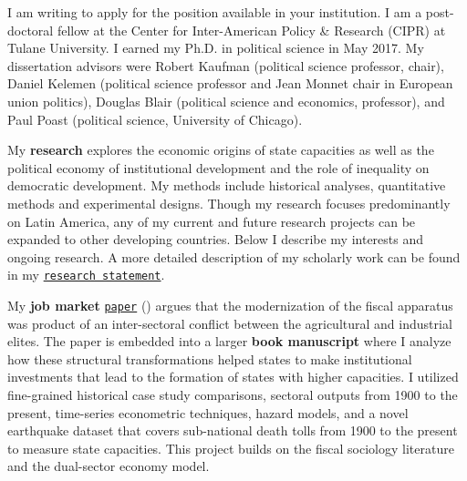 \documentclass[10pt,stdletter,dateno,sigleft]{newlfm} %
\begin{document}
\begin{newlfm}


\vspace{-0.3cm}I am writing to apply for the position available in your institution. I am a post-doctoral fellow at the Center for Inter-American Policy \& Research (CIPR) at Tulane University. I earned my Ph.D. in political science in May 2017. My dissertation advisors were Robert Kaufman (political science professor, chair), Daniel Kelemen (political science professor and Jean Monnet chair in European union politics), Douglas Blair (political science and economics, professor), and Paul Poast (political science, University of Chicago).

My {\bf research} explores the economic origins of state capacities as well as the political economy of institutional development and the role of inequality on democratic development. My methods include historical analyses, quantitative methods and experimental designs. Though my research focuses predominantly on Latin America, any of my current and future research projects can be expanded to other developing countries. Below I describe my interests and ongoing research. A more detailed description of my scholarly work can be found in my \href{http://github.com/hbahamonde/Job_Market/raw/master/Bahamonde_Research_Statement.pdf}{\texttt{research statement}}.


My {\bf job market} \href{https://github.com/hbahamonde/IncomeTaxAdoption/raw/master/Bahamonde_IncomeTaxAdoption.pdf}{\texttt{paper}} (\emph{\unskip}) argues that the modernization of the fiscal apparatus was product of an inter-sectoral conflict between the agricultural and industrial elites. The paper is embedded into a larger {\bf book manuscript} where I analyze how these structural transformations helped states to make institutional investments that lead to the formation of states with higher capacities. I utilized fine-grained historical case study comparisons, sectoral outputs from 1900 to the present, time-series econometric techniques, hazard models, and a novel earthquake dataset that covers sub-national death tolls from 1900 to the present to measure state capacities. This project builds on the fiscal sociology literature and the dual-sector economy model. 


\end{newlfm}
\end{document}
